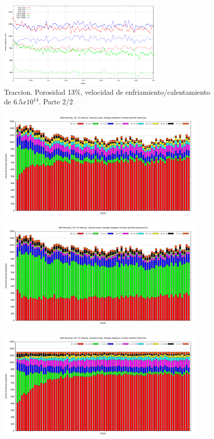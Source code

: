 \documentclass[10pt, oneside]{article} %
\begin{document}
\begin{figure}[H]
\centering
\includegraphics[width=8cm]{Figures/Porosidad/Porosidad_2vel_voronoi_13_14_trac2.png}
\caption{Traccion. Porosidad 13\%, velocidad de enfriamiento/calentamiento de $6.5x10^{14}$. Parte 2/2}
\label{fg:11trac}
\end{figure}

\begin{figure}[H]
\centering
\includegraphics[width=10cm]{Figures/Porosidad/Porosidad_2vel_trac_voronoi_hist1.png}
\caption{}
\end{figure}

\begin{figure}[H]
\centering
\includegraphics[width=10cm]{Figures/Porosidad/Porosidad_2vel_trac_voronoi_hist2.png}
\caption{}
\end{figure}

\begin{figure}[H]
\centering
\includegraphics[width=10cm]{Figures/Porosidad/Porosidad_2vel_trac_voronoi_hist3.png}
\caption{}
\end{figure}
\end{document}
